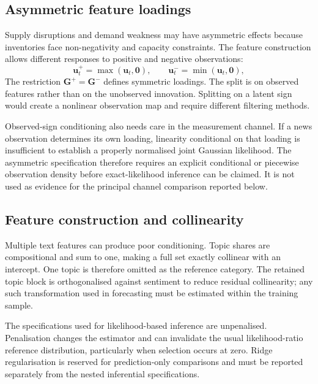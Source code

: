 \documentclass[journal]{IEEEtran}
\begin{document}
\subsection{Asymmetric feature loadings}
\label{sec:asym}

Supply disruptions and demand weakness may have asymmetric effects because inventories face non-negativity and capacity constraints. The feature construction allows different responses to positive and negative observations:
\begin{equation}
  \bm{u}^{+}_t = \max(\bm{u}_t, \bm{0}), \qquad
  \bm{u}^{-}_t = \min(\bm{u}_t, \bm{0}) ,
  \label{eq:asym}
\end{equation}
The restriction $\bm{G}^{+}=\bm{G}^{-}$ defines symmetric loadings. The split is on observed features rather than on the unobserved innovation. Splitting on a latent sign would create a nonlinear observation map and require different filtering methods.

Observed-sign conditioning also needs care in the measurement channel. If a news observation determines its own loading, linearity conditional on that loading is insufficient to establish a properly normalised joint Gaussian likelihood. The asymmetric specification therefore requires an explicit conditional or piecewise observation density before exact-likelihood inference can be claimed. It is not used as evidence for the principal channel comparison reported below.

\subsection{Feature construction and collinearity}
\label{sec:collinear}

Multiple text features can produce poor conditioning. Topic shares are compositional and sum to one, making a full set exactly collinear with an intercept. One topic is therefore omitted as the reference category. The retained topic block is orthogonalised against sentiment to reduce residual collinearity; any such transformation used in forecasting must be estimated within the training sample.

The specifications used for likelihood-based inference are unpenalised. Penalisation changes the estimator and can invalidate the usual likelihood-ratio reference distribution, particularly when selection occurs at zero. Ridge regularisation is reserved for prediction-only comparisons and must be reported separately from the nested inferential specifications.
\end{document}
